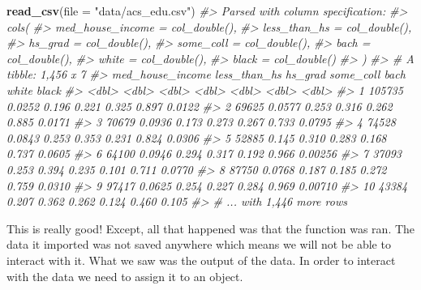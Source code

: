\documentclass[
]{book}
\newenvironment{Shaded}{\begin{snugshade}}{\end{snugshade}}
\newcommand{\CommentTok}[1]{\textcolor[rgb]{0.56,0.35,0.01}{\textit{#1}}}
\newcommand{\DataTypeTok}[1]{\textcolor[rgb]{0.13,0.29,0.53}{#1}}
\newcommand{\KeywordTok}[1]{\textcolor[rgb]{0.13,0.29,0.53}{\textbf{#1}}}
\newcommand{\NormalTok}[1]{#1}
\newcommand{\StringTok}[1]{\textcolor[rgb]{0.31,0.60,0.02}{#1}}
\begin{document}
\begin{Shaded}
\begin{Highlighting}[]
\KeywordTok{read\_csv}\NormalTok{(}\DataTypeTok{file =} \StringTok{"data/acs\_edu.csv"}\NormalTok{) }
\CommentTok{\#\textgreater{} Parsed with column specification:}
\CommentTok{\#\textgreater{} cols(}
\CommentTok{\#\textgreater{}   med\_house\_income = col\_double(),}
\CommentTok{\#\textgreater{}   less\_than\_hs = col\_double(),}
\CommentTok{\#\textgreater{}   hs\_grad = col\_double(),}
\CommentTok{\#\textgreater{}   some\_coll = col\_double(),}
\CommentTok{\#\textgreater{}   bach = col\_double(),}
\CommentTok{\#\textgreater{}   white = col\_double(),}
\CommentTok{\#\textgreater{}   black = col\_double()}
\CommentTok{\#\textgreater{} )}
\CommentTok{\#\textgreater{} \# A tibble: 1,456 x 7}
\CommentTok{\#\textgreater{}    med\_house\_income less\_than\_hs hs\_grad some\_coll  bach white   black}
\CommentTok{\#\textgreater{}               \textless{}dbl\textgreater{}        \textless{}dbl\textgreater{}   \textless{}dbl\textgreater{}     \textless{}dbl\textgreater{} \textless{}dbl\textgreater{} \textless{}dbl\textgreater{}   \textless{}dbl\textgreater{}}
\CommentTok{\#\textgreater{}  1           105735       0.0252   0.196     0.221 0.325 0.897 0.0122 }
\CommentTok{\#\textgreater{}  2            69625       0.0577   0.253     0.316 0.262 0.885 0.0171 }
\CommentTok{\#\textgreater{}  3            70679       0.0936   0.173     0.273 0.267 0.733 0.0795 }
\CommentTok{\#\textgreater{}  4            74528       0.0843   0.253     0.353 0.231 0.824 0.0306 }
\CommentTok{\#\textgreater{}  5            52885       0.145    0.310     0.283 0.168 0.737 0.0605 }
\CommentTok{\#\textgreater{}  6            64100       0.0946   0.294     0.317 0.192 0.966 0.00256}
\CommentTok{\#\textgreater{}  7            37093       0.253    0.394     0.235 0.101 0.711 0.0770 }
\CommentTok{\#\textgreater{}  8            87750       0.0768   0.187     0.185 0.272 0.759 0.0310 }
\CommentTok{\#\textgreater{}  9            97417       0.0625   0.254     0.227 0.284 0.969 0.00710}
\CommentTok{\#\textgreater{} 10            43384       0.207    0.362     0.262 0.124 0.460 0.105  }
\CommentTok{\#\textgreater{} \# ... with 1,446 more rows}
\end{Highlighting}
\end{Shaded}

This is really good! Except, all that happened was that the function was ran. The data it imported was not saved anywhere which means we will not be able to interact with it. What we saw was the output of the data. In order to interact with the data we need to assign it to an object.
\end{document}
